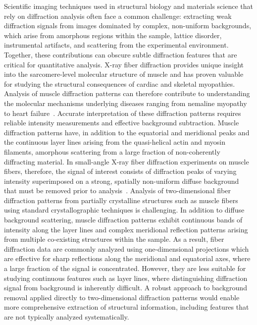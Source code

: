 \documentclass[iucr]{iucrjournals}
\begin{document}
Scientific imaging techniques used in structural biology and materials science that rely on diffraction analysis often face a common challenge: extracting weak diffraction signals from images dominated by complex, non-uniform backgrounds, which arise from amorphous regions within the sample, lattice disorder, instrumental artifacts, and scattering from the experimental environment. Together, these contributions can obscure subtle diffraction features that are critical for quantitative analysis. X-ray fiber diffraction provides unique insight into the sarcomere-level molecular structure of muscle and has proven valuable for studying the structural consequences of cardiac and skeletal myopathies. Analysis of muscle diffraction patterns can therefore contribute to understanding the molecular mechanisms underlying diseases ranging from nemaline myopathy to heart failure~\cite{MaIrving2022}. Accurate interpretation of these diffraction patterns requires reliable intensity measurements and effective background subtraction. Muscle diffraction patterns have, in addition to the equatorial and meridional peaks and the continuous layer lines arising from the quasi-helical actin and myosin filaments, amorphous scattering from a large fraction of non-coherently diffracting material. In small-angle X-ray fiber diffraction experiments on muscle fibers, therefore, the signal of interest consists of diffraction peaks of varying intensity superimposed on a strong, spatially non-uniform diffuse background that must be removed prior to analysis~\cite{squire2003ccp13_software}. Analysis of two-dimensional fiber diffraction patterns from partially crystalline structures such as muscle fibers using standard crystallographic techniques is challenging. In addition to diffuse background scattering, muscle diffraction patterns exhibit continuous bands of intensity along the layer lines and complex meridional reflection patterns arising from multiple co-existing structures within the sample. As a result, fiber diffraction data are commonly analyzed using one-dimensional projections which are effective for sharp reflections along the meridional and equatorial axes, where a large fraction of the signal is concentrated. However, they are less suitable for studying continuous features such as layer lines, where distinguishing diffraction signal from background is inherently difficult. A robust approach to background removal applied directly to two-dimensional diffraction patterns would enable more comprehensive extraction of structural information, including features that are not typically analyzed systematically.
\end{document}
